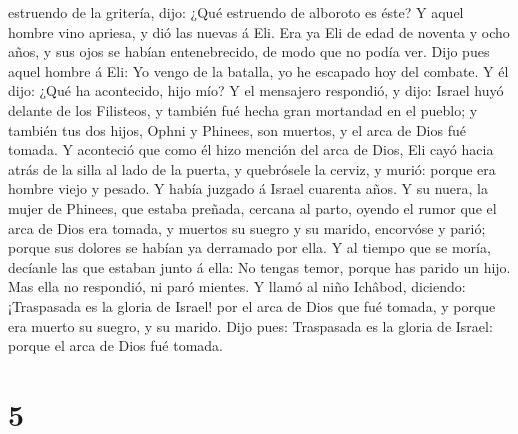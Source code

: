 estruendo de la gritería, dijo: ¿Qué estruendo de alboroto es éste? Y
aquel hombre vino apriesa, y dió las nuevas á Eli.  Era ya
Eli de edad de noventa y ocho años, y sus ojos se habían entenebrecido,
de modo que no podía ver.  Dijo pues aquel hombre á Eli: Yo
vengo de la batalla, yo he escapado hoy del combate. Y él dijo: ¿Qué ha
acontecido, hijo mío?  Y el mensajero respondió, y dijo:
Israel huyó delante de los Filisteos, y también fué hecha gran mortandad
en el pueblo; y también tus dos hijos, Ophni y Phinees, son muertos, y
el arca de Dios fué tomada.  Y aconteció que como él hizo
mención del arca de Dios, Eli cayó hacia atrás de la silla al lado de la
puerta, y quebrósele la cerviz, y murió: porque era hombre viejo y
pesado. Y había juzgado á Israel cuarenta años.  Y su
nuera, la mujer de Phinees, que estaba preñada, cercana al parto, oyendo
el rumor que el arca de Dios era tomada, y muertos su suegro y su
marido, encorvóse y parió; porque sus dolores se habían ya derramado por
ella.  Y al tiempo que se moría, decíanle las que estaban
junto á ella: No tengas temor, porque has parido un hijo. Mas ella no
respondió, ni paró mientes.  Y llamó al niño Ichâbod,
diciendo: ¡Traspasada es la gloria de Israel! por el arca de Dios que
fué tomada, y porque era muerto su suegro, y su marido. 
Dijo pues: Traspasada es la gloria de Israel: porque el arca de Dios fué
tomada.

\hypertarget{section-4}{%
\section{5}\label{section-4}}

